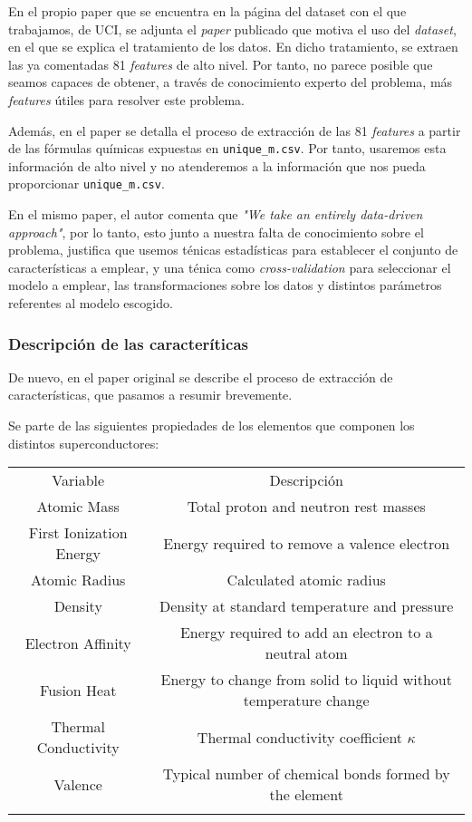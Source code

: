 \documentclass[11pt]{article}
\begin{document}
En el propio paper que se encuentra en la página del dataset con el que trabajamos, de UCI, se adjunta el \emph{paper} publicado que motiva el uso del \emph{dataset}, en el que se explica el tratamiento de los datos. En dicho tratamiento, se extraen las ya comentadas 81 \emph{features} de alto nivel. Por tanto, no parece posible que seamos capaces de obtener, a través de conocimiento experto del problema, más \emph{features} útiles para resolver este problema.

Además, en el paper se detalla el proceso de extracción de las 81 \emph{features} a partir de las fórmulas químicas expuestas en \lstinline{unique_m.csv}. Por tanto, usaremos esta información de alto nivel y no atenderemos a la información que nos pueda proporcionar \lstinline{unique_m.csv}.

En el mismo paper, el autor comenta que \emph{"We take an entirely data-driven approach"}, por lo tanto, esto junto a nuestra falta de conocimiento sobre el problema, justifica que usemos ténicas estadísticas para establecer el conjunto de características a emplear, y una ténica como \emph{cross-validation} para seleccionar el modelo a emplear, las transformaciones sobre los datos y distintos parámetros referentes al modelo escogido.


\subsubsection{Descripción de las caracteríticas}

De nuevo, en el paper original \cite{original_paper_reg:paper} se describe el proceso de extracción de características, que pasamos a resumir brevemente.

Se parte de las siguientes propiedades de los elementos que componen los distintos superconductores:

\begin{center}
\begin{tabular}{|c|c|}
 \hline
    Variable & Descripción \\
    Atomic Mass & Total proton and neutron rest masses \\
    First Ionization Energy & Energy required to remove a valence electron \\
    Atomic Radius & Calculated atomic radius \\
    Density & Density at standard temperature and pressure \\
    Electron Affinity & Energy required to add an electron to a neutral atom \\
    Fusion Heat & Energy to change from solid to liquid without temperature change \\
    Thermal Conductivity &  Thermal conductivity coefficient $\kappa$ \\
    Valence & Typical number of chemical bonds formed by the element \\
 \hline
\caption{Propiedades de los elementos usadas para crear las \emph{features}}
\end{tabular}
\end{center}
\end{document}
